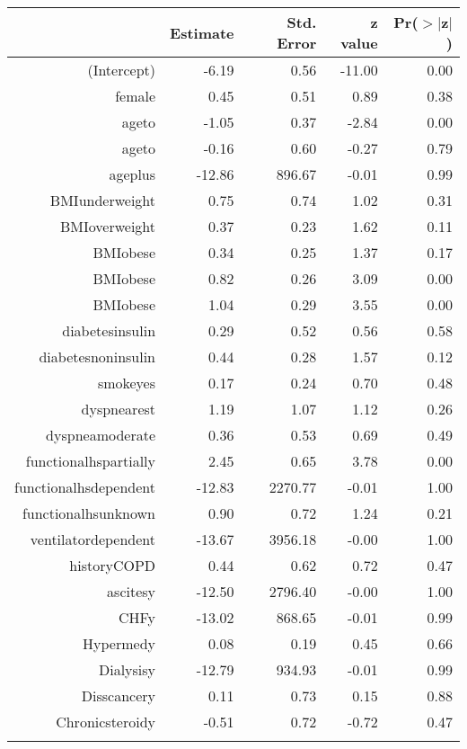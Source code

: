 \bigskip\bigskip
\centering
\begin{tabular}{rrrrr}
  \hline
 & Estimate & Std. Error & z value & Pr($>$$|$z$|$) \\ 
  \hline
(Intercept) & -6.19 & 0.56 & -11.00 & 0.00 \\ 
  female & 0.45 & 0.51 & 0.89 & 0.38 \\ 
  age\-65\-to\-74 & -1.05 & 0.37 & -2.84 & 0.00 \\ 
  age\-75\-to\-84 & -0.16 & 0.60 & -0.27 & 0.79 \\ 
  age\-85\-plus & -12.86 & 896.67 & -0.01 & 0.99 \\ 
  BMI\-underweight & 0.75 & 0.74 & 1.02 & 0.31 \\ 
  BMI\-overweight & 0.37 & 0.23 & 1.62 & 0.11 \\ 
  BMI\-obese\-1 & 0.34 & 0.25 & 1.37 & 0.17 \\ 
  BMI\-obese\-2 & 0.82 & 0.26 & 3.09 & 0.00 \\ 
  BMI\-obese\-3 & 1.04 & 0.29 & 3.55 & 0.00 \\ 
  diabetes\-insulin & 0.29 & 0.52 & 0.56 & 0.58 \\ 
  diabetes\-noninsulin & 0.44 & 0.28 & 1.57 & 0.12 \\ 
  smoke\-yes & 0.17 & 0.24 & 0.70 & 0.48 \\ 
  dyspnea\-rest & 1.19 & 1.07 & 1.12 & 0.26 \\ 
  dyspnea\-moderate & 0.36 & 0.53 & 0.69 & 0.49 \\ 
  functional\-hs\-partially & 2.45 & 0.65 & 3.78 & 0.00 \\ 
  functional\-hs\-dependent & -12.83 & 2270.77 & -0.01 & 1.00 \\ 
  functional\-hs\-unknown & 0.90 & 0.72 & 1.24 & 0.21 \\ 
  ventilator\-dependent & -13.67 & 3956.18 & -0.00 & 1.00 \\ 
  history\-COPD & 0.44 & 0.62 & 0.72 & 0.47 \\ 
  ascites\-y & -12.50 & 2796.40 & -0.00 & 1.00 \\ 
  CHF\-y & -13.02 & 868.65 & -0.01 & 0.99 \\ 
  Hyper\-med\-y & 0.08 & 0.19 & 0.45 & 0.66 \\ 
  Dialysis\-y & -12.79 & 934.93 & -0.01 & 0.99 \\ 
  Diss\-cancer\-y & 0.11 & 0.73 & 0.15 & 0.88 \\ 
  Chronic\-steroid\-y & -0.51 & 0.72 & -0.72 & 0.47 \\ 
$$
\end{tabular}

